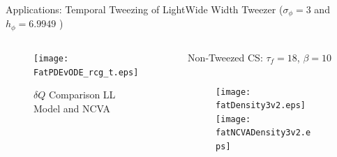 \begin{frame}[c]{Applications: Temporal Tweezing of Light}{\textcolor{paleblue}{Wide Width Tweezer} ($\sigma_\phi = 3$ and $h_\phi  = 6.9949$ )}

\begin{columns}

\begin{column}{0.28\textwidth}

\vspace{-7em}
\begin{framed}
\vspace{-1em}
\begin{figure}[h]
\centering
\centerline{\texttt{[image: FatPDEvODE\_rcg\_t.eps]}\hspace*{0cm}}
\caption{\tiny $\delta Q$ Comparison LL Model and NCVA}
\end{figure}
\vspace{-1em}
\end{framed}
\end{column}
\vrule width 1pt

\begin{column}{0.75\textwidth}
\vspace{-0.5em}
\centering
{\small Non-Tweezed CS:  $\tau_f =18$, $\beta = 10$ }
\vspace{0.5em}
\begin{columns}
\begin{column}{0.5\textwidth}
\vspace{-1em}
\begin{figure}
\hspace{2em}\texttt{[image: fatDensity3v2.eps]}  \\
\vspace{-0.5em}
\hspace{2em}\texttt{[image: fatNCVADensity3v2.eps]} 
\end{figure}
\end{column}
\begin{column}{0.5\textwidth}
\vspace{-0.5em} \raggedright
\hspace{-2em}%
\end{column}
\end{columns}
\vspace{0.5em}


\end{column}
\end{columns}
\end{frame}
